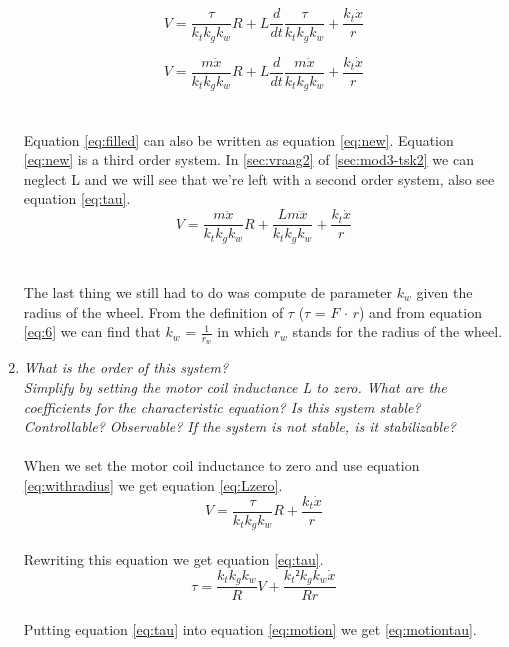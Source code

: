 \documentclass[final]{scrreprt} %
\begin{document}
\begin{enumerate}
\begin{equation}
V = \frac{\tau}{k_t k_g k_w}R + L\frac{d}{dt}\frac{\tau}{k_t k_g k_w} +  \frac{k_t \dot{x}}{r}
\label{eq:withradius}
\end{equation}

\begin{equation}
V = \frac{m\ddot{x}}{k_t k_g k_w}R + L\frac{d}{dt}\frac{m\ddot{x}}{k_t k_g k_w} +  \frac{k_t \dot{x}}{r}
\label{eq:filled}
\end{equation}\\
\\ 
Equation \ref{eq:filled} can also be written as equation \ref{eq:new}. Equation \ref{eq:new} is a third order system. In \ref{sec:vraag2} of \ref{sec:mod3-tsk2} we can neglect L and we will see that we're left with a second order system, also see equation \ref{eq:tau}. 
\begin{equation}
V = \frac{m\ddot{x}}{k_t k_g k_w}R + \frac{Lm\dddot{x}}{k_t k_g k_w} +  \frac{k_t \dot{x}}{r}
\label{eq:new}
\end{equation}\\
\\
The last thing we still had to do was compute de parameter $k_{w}$ given the radius of the wheel. From the definition of $\tau$ ($\tau$ = $F$ $\cdot$ $r$) and from equation \ref{eq:6} we can find that $k_{w}$ =  $\frac{1}{r_w}$ in which $r_{w}$ stands for the radius of the wheel. 


\item \textit{What is the order of this system?\\ Simplify  by setting the motor coil inductance L to zero. What are the coefficients for the characteristic equation? Is this system stable? Controllable? Observable? If the system is not stable, is it stabilizable?}
\label{sec:vraag2}\\
\\
When we set the motor coil inductance to zero and use equation \ref{eq:withradius} we get equation \ref{eq:Lzero}.
\begin{equation}
V = \frac{\tau}{k_t k_g k_w}R +  \frac{k_t \dot{x}}{r}
\label{eq:Lzero}
\end{equation}\\
Rewriting this equation we get equation \ref{eq:tau}. 
\begin{equation}
\tau = \frac{k_t k_g k_w}{R} V +  \frac{k_t² k_g k_w \dot{x}}{Rr}
\label{eq:tau}
\end{equation}
\\
Putting equation \ref{eq:tau} into equation \ref{eq:motion} we get \ref{eq:motiontau}.


\end{enumerate}
\end{document}
